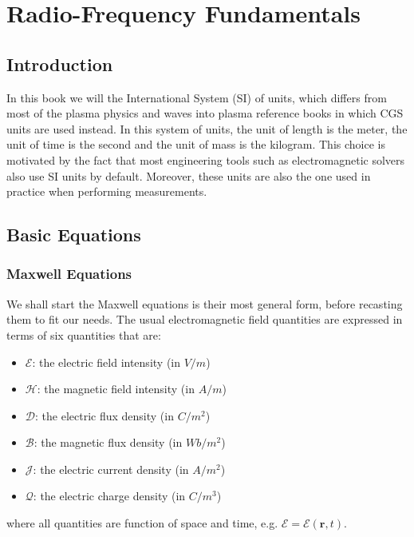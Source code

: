 \chapter{Radio-Frequency Fundamentals}

\section{Introduction}
In this book we will the International System (SI) of units, which differs from most of the plasma physics and waves into plasma reference books in which CGS units are used instead. In this system of units, the unit of length is the meter, the unit of time is the second and the unit of mass is the kilogram. This choice is motivated by the fact that most engineering tools such as electromagnetic solvers also use SI units by default. Moreover, these units are also the one used in practice when performing measurements. 

\section{Basic Equations}
\subsection{Maxwell Equations}
We shall start the Maxwell equations is their most general form, before recasting them to fit our needs. The usual electromagnetic field quantities are expressed in terms of six quantities that are:
\begin{itemize}
 \item $\mathcal{E}$: the electric field intensity (in $V/m$)
 \item $\mathcal{H}$: the magnetic field intensity (in $A/m$)
 \item $\mathcal{D}$: the electric flux density (in $C/m^2$)
 \item $\mathcal{B}$: the magnetic flux density (in $Wb/m^2$)
 \item $\mathcal{J}$: the electric current density (in $A/m^2$)
 \item $\mathcal{Q}$: the electric charge density (in $C/m^3$)
\end{itemize}
where all quantities are function of space and time, e.g. $\mathcal{E}=\mathcal{E}(\mathbf{r},t)$.

